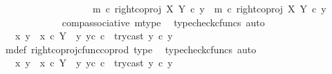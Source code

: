 \begin{isabellebody}
\ \ \ \ \ \ \isamarkupfalse%
\ {\isacharminus}{\kern0pt}\ \isanewline
\ \ \ \ \ \ \ \ \isamarkupfalse%
\ {\isachardoublequoteopen}m\ {\isasymcirc}\isactrlsub c\ right{\isacharunderscore}{\kern0pt}coproj\ X\ Y\ {\isasymcirc}\isactrlsub c\ y{}\ {\isacharequal}{\kern0pt}\ {\isacharparenleft}{\kern0pt}m\ {\isasymcirc}\isactrlsub c\ right{\isacharunderscore}{\kern0pt}coproj\ X\ Y{\isacharparenright}{\kern0pt}\ {\isasymcirc}\isactrlsub c\ y{}{\isachardoublequoteclose}\isanewline
\ \ \ \ \ \ \ \ \ \ \isamarkupfalse%
\ \ comp{\isacharunderscore}{\kern0pt}associative{}\ m{\isacharunderscore}{\kern0pt}type\ \isamarkupfalse%
\ {\isacharparenleft}{\kern0pt}typecheck{\isacharunderscore}{\kern0pt}cfuncs{\isacharcomma}{\kern0pt}\ auto{\isacharparenright}{\kern0pt}\isanewline
\ \ \ \ \ \ \ \ \isamarkupfalse%
\ \isamarkupfalse%
\ {\isachardoublequoteopen}{\isachardot}{\kern0pt}{\isachardot}{\kern0pt}{\isachardot}{\kern0pt}\ {\isacharequal}{\kern0pt}\ {\isacharparenleft}{\kern0pt}{\isacharparenleft}{\kern0pt}{\isasymlangle}x{}{\isacharcomma}{\kern0pt}\ y{}{\isasymrangle}\ {\isasymamalg}\ {\isasymlangle}x{}\ {\isasymcirc}\isactrlsub c\ {\isasymbeta}\isactrlbsub Y\ {\isasymsetminus}\ {\isacharparenleft}{\kern0pt}{\isasymone}{\isacharcomma}{\kern0pt}y{}{\isacharparenright}{\kern0pt}\isactrlesub {\isacharcomma}{\kern0pt}\ y{}\isactrlsup c{\isasymrangle}{\isacharparenright}{\kern0pt}\ {\isasymcirc}\isactrlsub c\ \ try{\isacharunderscore}{\kern0pt}cast\ y{}{\isacharparenright}{\kern0pt}\ {\isasymcirc}\isactrlsub c\ y{}{\isachardoublequoteclose}\isanewline
\ \ \ \ \ \ \ \ \ \ \isamarkupfalse%
\ m{\isacharunderscore}{\kern0pt}def\ right{\isacharunderscore}{\kern0pt}coproj{\isacharunderscore}{\kern0pt}cfunc{\isacharunderscore}{\kern0pt}coprod\ type{}\ \isamarkupfalse%
\ {\isacharparenleft}{\kern0pt}typecheck{\isacharunderscore}{\kern0pt}cfuncs{\isacharcomma}{\kern0pt}\ auto{\isacharparenright}{\kern0pt}\isanewline
\ \ \ \ \ \ \ \ \isamarkupfalse%
\ \isamarkupfalse%
\ {\isachardoublequoteopen}{\isachardot}{\kern0pt}{\isachardot}{\kern0pt}{\isachardot}{\kern0pt}\ {\isacharequal}{\kern0pt}\ {\isacharparenleft}{\kern0pt}{\isasymlangle}x{}{\isacharcomma}{\kern0pt}\ y{}{\isasymrangle}\ {\isasymamalg}\ {\isasymlangle}x{}\ {\isasymcirc}\isactrlsub c\ {\isasymbeta}\isactrlbsub Y\ {\isasymsetminus}\ {\isacharparenleft}{\kern0pt}{\isasymone}{\isacharcomma}{\kern0pt}y{}{\isacharparenright}{\kern0pt}\isactrlesub {\isacharcomma}{\kern0pt}\ y{}\isactrlsup c{\isasymrangle}{\isacharparenright}{\kern0pt}\ {\isasymcirc}\isactrlsub c\ \ try{\isacharunderscore}{\kern0pt}cast\ y{}\ {\isasymcirc}\isactrlsub c\ y{}{\isachardoublequoteclose}\isanewline

\end{isabellebody}
